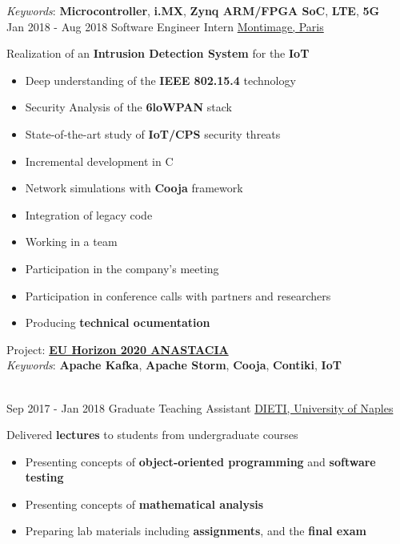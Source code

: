\documentclass[letterpaper]{twentysecondcv} %
\begin{document}
\begin{twenty}
{            \textit{Keywords}: \textbf{Microcontroller}, \textbf{i.MX}, \textbf{Zynq ARM/FPGA SoC}, \textbf{LTE}, \textbf{5G}
        }\\
    \twentyitem
    	{Jan 2018 -}
		{Aug 2018}
        {Software Engineer Intern}
        {\href{https://www.montimage.com/}{Montimage, Paris}}
        {}
        {
            Realization of an \textbf{Intrusion Detection System} for the \textbf{IoT}
            \begin{itemize}
                \item Deep understanding of the \textbf{IEEE 802.15.4} technology
                \item Security Analysis of the \textbf{6loWPAN} stack
                \item State-of-the-art study of \textbf{IoT/CPS} security threats
                \item Incremental development in C
                \item Network simulations with \textbf{Cooja} framework
                \item Integration of legacy code
                \item Working in a team
                \item Participation in the company's meeting
                \item Participation in conference calls with partners and researchers
                \item Producing \textbf{technical ocumentation}
            \end{itemize}
            Project: \href{http://www.anastacia-h2020.eu/}{\textbf{EU Horizon 2020 ANASTACIA}}\\
            \textit{Keywords}: \textbf{Apache Kafka}, \textbf{Apache Storm}, \textbf{Cooja}, \textbf{Contiki}, \textbf{IoT}
        }\\
    \twentyitem
   		{Sep 2017 -}
		{Jan 2018}
        {Graduate Teaching Assistant}
        {\href{http://www.scuolapsb.unina.it/}{DIETI, University of Naples}}
        {}
        {
            Delivered \textbf{lectures} to students from undergraduate courses
            \begin{itemize}
                \item Presenting concepts of \textbf{object-oriented programming} and \textbf{software testing}
                \item Presenting concepts of \textbf{mathematical analysis}
                \item Preparing lab materials including \textbf{assignments}, and the \textbf{final exam}
            \end{itemize}
        }
\end{twenty}
\end{document}

